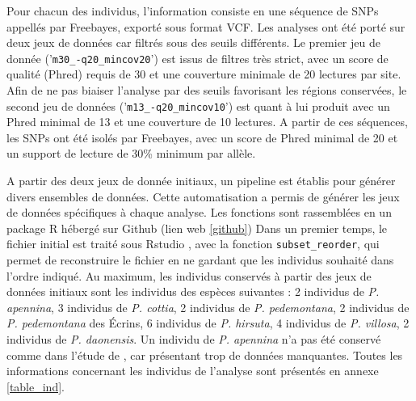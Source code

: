 Pour chacun des individus, l'information consiste en une séquence de SNPs appellés par Freebayes, exporté sous format VCF. 
Les analyses ont été porté sur deux jeux de données car filtrés sous des seuils différents.
Le premier jeu de donnée ('\verb|m30_-q20_mincov20|') est issus de filtres très strict, avec un score de qualité (Phred) requis de 30 et une couverture minimale de 20 lectures par site. 
Afin de ne pas biaiser l'analyse par des seuils favorisant les régions conservées, le second jeu de données ('\verb|m13_-q20_mincov10|') est quant à lui produit avec un Phred minimal de 13 et une couverture de 10 lectures. 
A partir de ces séquences, les SNPs ont été isolés par Freebayes, avec un score de Phred minimal de 20 et un support de lecture de 30\% minimum par allèle.

A partir des deux jeux de donnée initiaux, un pipeline est établis pour générer divers ensembles de données. 
Cette automatisation a permis de générer les jeux de données spécifiques à chaque analyse. 
Les fonctions sont rassemblées en un package R hébergé sur Github (lien web \ref{github})
Dans un premier temps, le fichier initial est traité sous Rstudio \citep{RTeam2017}, avec la fonction \verb|subset_reorder|, qui permet de reconstruire le fichier en ne gardant que les individus souhaité dans l'ordre indiqué. 
Au maximum, les individus conservés à partir des jeux de données initiaux sont les individus des espèces suivantes :
2 individus de \textit{P. apennina}, 
3 individus de \textit{P. cottia}, 
2 individus de \textit{P. pedemontana}, 
2 individus de \textit{P. pedemontana} des Écrins, 
6 individus de \textit{P. hirsuta}, 
4 individus de \textit{P. villosa}, 
2 individus de \textit{P. daonensis}.
Un individu de \textit{P. apennina} n'a pas été conservé comme dans l'étude de \citet{Boucher2016a}, car présentant trop de données manquantes.
Toutes les informations concernant les individus de l'analyse sont présentés en annexe \ref{table_ind}.


